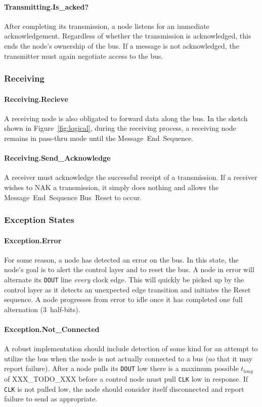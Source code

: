 \paragraph{Transmitting.{\sc Is\_acked?}}
After completing its transmission, a node listens for an immediate
acknowledgement. Regardless of whether the transmission is acknowledged, this
ends the node's ownership of the bus. If a message is not acknowledged, the
transmitter must again negotiate access to the bus.

\subsubsection{Receiving}

\paragraph{Receiving.{\sc Recieve}}
A receiving node is also obligated to forward data along the bus. In the
sketch shown in Figure~\ref{fig:logical}, during the receiving process, a
receiving node remains in pass-thru mode until the Message~End~Sequence.

\paragraph{Receiving.{\sc Send\_Acknowledge}}
A receiver must acknowledge the successful receipt of a transmission. If a
receiver wishes to NAK a transmission, it simply does nothing and allows the
Message~End~Sequence Bus~Reset to occur.

\subsubsection{Exception States}

\paragraph{Exception.{\sc Error}}
For some reason, a node has detected an error on the bus. In this state, the
node's goal is to alert the control layer and to reset the bus. A node in {\sc
error} will alternate its {\tt DOUT} line {\em every} clock edge. This will
quickly be picked up by the control layer as it detects an unexpected edge
transition and initiates the Reset sequence. A node progresses from {\sc error}
to {\sc idle} once it has completed one full alternation (3~half-bits).

\paragraph{Exception.{\sc Not\_Connected}}
A robust implementation should include detection of some kind for an attempt
to utilize the bus when the node is not actually connected to a bus (so that
it may report failure). After a node pulls its {\tt DOUT} low there is a
maximum possible $t_{long}$ of XXX\_TODO\_XXX before a control node must pull
{\tt CLK} low in response. If {\tt CLK} is not pulled low, the node should
consider itself disconnected and report failure to send as appropriate.
